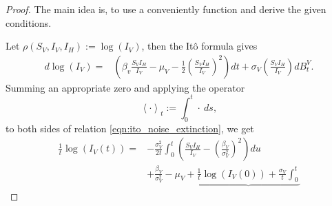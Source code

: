 \documentclass{amsart}
\theoremstyle{plain}
\theoremstyle{definition}
\begin{document}
        \begin{proof}
            The main idea is, to use a conveniently function and derive the 
            given conditions. 
            
            Let $\rho (S_V, I_V, I_H):= \log (I_V)$, then the It\^{o} formula 
            gives
            \begin{equation} \label{eqn:ito_noise_extinction}
                \begin{aligned}
                    d \log(I_V) = & 
                        \left(
                            \beta_v \frac{S_V I_H}{ I_V} - \mu_V
                            - \frac{1}{2}
                            \left(
                                \frac{S_V I_H}{I_V}
                            \right) ^ 2
                        \right) dt
                         + \sigma_V 
                        \left(
                            \frac{S_V I_H}{ I_V}
                        \right) dB_t ^ V.
                \end{aligned}
            \end{equation}
            Summing an appropriate zero and applying the operator
            $$
                \left < \cdot \right >_t
                := 
                \int_{0} ^ t
                    \cdot \ ds,
            $$
            to both sides of relation \eqref{eqn:ito_noise_extinction}, we get
            \begin{equation} \label{eqn:applying_mean_opeartor}
                \begin{aligned}
                    \frac{1}{t} \log(I_V(t))
                    =&
                    - 
                    \frac{\sigma_V ^ 2}{2t}
                    \int_{0} ^ {t}
                        \left(
                            \frac{S_V I_H}{I_V} 
                            -
                            \left(
                                \frac{\beta_V}{\sigma_V ^ 2}
                            \right) ^ 2
                        \right)
                    du
                    \\
                    & + 
                    \frac{\beta_V}{\sigma_V ^ 2}
                    - 
                    \mu_V 
                    + 
                    \underbrace{
                        \frac{1}{t} \log(I_V(0))
                        +
                        \frac{\sigma_V}{t}
                        \int_{0}^t
}
\end{aligned}
\end{equation}
\end{proof}
\end{document}
